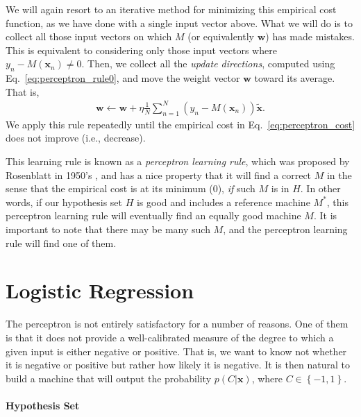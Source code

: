 \documentclass{report}
\newcommand{\vect}[1]{\mathbf{#1}}
\newcommand{\vx}[0]{\vect{x}}
\newcommand{\vw}[0]{\vect{w}}
\begin{document}
We will again resort to an iterative method for minimizing this empirical cost
function, as we have done with a single input vector above. What we will do is
to collect all those input vectors on which $M$ (or equivalently $\vw$) has made
mistakes. This is equivalent to considering only those input vectors where
$y_n-M(\vx_n) \neq 0$. Then, we collect all the {\it update directions},
computed using Eq.~\eqref{eq:perceptron_rule0}, and move the weight vector
$\vw$ toward its average. That is,
\begin{align}
    \label{eq:perceptron_rule1}
    \vw \leftarrow \vw + \eta \frac{1}{N} \sum_{n=1}^N \left( y_n - M(\vx_n)\right) \tilde{\vx}.
\end{align}
We apply this rule repeatedly until the empirical cost in
Eq.~\eqref{eq:perceptron_cost} does not improve (i.e., decrease). 

This learning rule is known as a {\it perceptron learning rule}, which was
proposed by Rosenblatt in 1950's \cite{Rosenblatt1962}, and has a nice property
that it will find a correct $M$ in the sense that the empirical cost is at its
minimum (0), {\it if} such $M$ is in $H$. In other words, if our hypothesis set
$H$ is good and includes a reference machine $M^*$, this perceptron learning
rule will eventually find an equally good machine $M$. It is important to note
that there may be many such $M$, and the perceptron learning rule will find one
of them. 


\section{Logistic Regression}
\label{sec:logreg}

The perceptron is not entirely satisfactory for a number of reasons. One
of them is that it does not provide a well-calibrated measure of the degree to
which a given input is either negative or positive. That is, we want to know not
whether it is negative or positive but rather how likely it is negative. It is
then natural to build a machine that will output the probability $p(C|\vx)$,
where $C \in \left\{ -1, 1\right\}$.

\paragraph{Hypothesis Set} 
\end{document}
